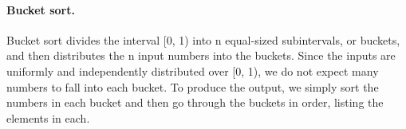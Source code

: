 



\paragraph{Bucket sort.}
Bucket sort divides the interval [0, 1) into n equal-sized subintervals, or buckets, and then distributes the n input numbers into the buckets. Since the inputs are uniformly and independently distributed over [0, 1), we do not expect many numbers to fall into each bucket. To produce the output, we simply sort the numbers in each bucket and then go through the buckets in order, listing the elements in each.

